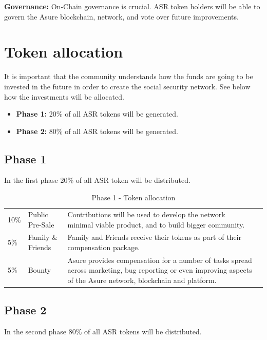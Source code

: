 \textbf{Governance:}
On-Chain governance is crucial. ASR token holders will be able to govern the Asure blockchain, network, and vote over future improvements.
\newline\newline


\section{Token allocation}

It is important that the community understands how the funds are going to be invested in the future in order to create the social security network. See below how the investments will be allocated.

\begin{itemize}
\item \textbf{Phase 1:} 20\% of all ASR tokens will be generated.
\item \textbf{Phase 2:} 80\% of all ASR tokens will be generated.
\end{itemize}

\subsection{Phase 1}

In the first phase 20\% of all ASR token will be distributed.

\begin{table}[H]
\begin{tabular}{llp{}l}
  10\% & Public Pre-Sale & Contributions will be used to develop the network minimal viable product, and to build bigger community.\\
  5\% & Family \& Friends & Family and Friends receive their tokens as part of their compensation package.\\
  5\% & Bounty & Asure provides compensation for a number of tasks spread across marketing, bug reporting or even improving aspects of the Asure network, blockchain and platform.
\end{tabular}
\caption{\label{tab:table-name} Phase 1 - Token allocation}
\end{table}

\newpage
\subsection{Phase 2}

In the second phase 80\% of all ASR tokens will be distributed.

